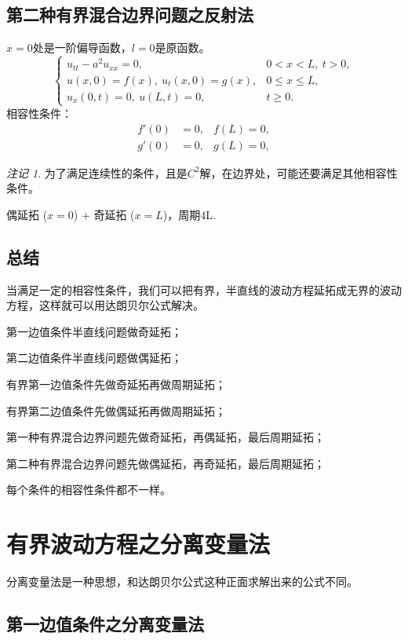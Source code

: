 \documentclass[12pt,a4paper]{article}
\numberwithin{subsection}{section}
\numberwithin{subsubsection}{subsection}
\theoremstyle{plain}
\theoremstyle{definition}
\theoremstyle{remark}
\newtheorem{remark}[theorem]{注记}
\begin{document}
\subsection{第二种有界混合边界问题之反射法}
	$x=0$处是一阶偏导函数，$ l=0$是原函数。
		\begin{equation}
		\begin{cases}
			u_{tt} - a^2 u_{xx} = 0, & 0 < x < L, \ t > 0, \\
			u(x, 0) = f(x), \ u_t(x, 0) = g(x), & 0 \leq x \leq L, \\
			u_x(0, t) = 0, \ u(L, t) = 0, & t \geq 0.
		\end{cases}
	\end{equation}
	相容性条件：
	\begin{equation}
		\begin{aligned}
			f'(0) & = 0, & f(L)  = 0, \\
			g'(0) & =0, & g(L)  = 0,
		\end{aligned}
	\end{equation}
	\begin{remark}
		为了满足连续性的条件，且是$C^2$解，在边界处，可能还要满足其他相容性条件。
	\end{remark}
	
	偶延拓 ($x=0$) + 奇延拓 ($x=L$)，周期4L.
	
\subsection{总结}
当满足一定的相容性条件，我们可以把有界，半直线的波动方程延拓成无界的波动方程，这样就可以用达朗贝尔公式解决。

第一边值条件半直线问题做奇延拓；

第二边值条件半直线问题做偶延拓；

有界第一边值条件先做奇延拓再做周期延拓；

有界第二边值条件先做偶延拓再做周期延拓；

第一种有界混合边界问题先做奇延拓，再偶延拓，最后周期延拓；

第二种有界混合边界问题先做偶延拓，再奇延拓，最后周期延拓；

每个条件的相容性条件都不一样。

	\newpage
	
	\section{有界波动方程之分离变量法}
	分离变量法是一种思想，和达朗贝尔公式这种正面求解出来的公式不同。
	\subsection{第一边值条件之分离变量法}
\end{document}
